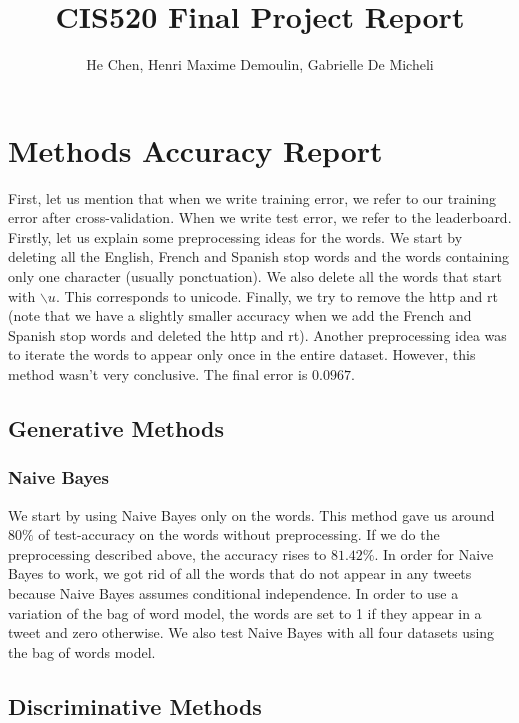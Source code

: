 \documentclass[11pt,twocolumn]{report}
\author{He Chen, Henri Maxime Demoulin, Gabrielle De Micheli}
\title{CIS520 Final Project Report}
\begin{document}
\maketitle
\section*{Methods Accuracy Report}
	First, let us mention that when we write training error, we refer to our training error after cross-validation. When we write test error, we refer to the leaderboard.\\
    
    Firstly, let us explain some preprocessing ideas for the words. We start by deleting all the English, French and Spanish stop words and the words containing only one character (usually ponctuation). We also delete all the words that start with $\backslash u$. This corresponds to unicode. Finally, we try to remove the http and rt (note that we have a slightly smaller accuracy when we add the French and Spanish stop words and deleted the http and rt).  Another preprocessing idea was to iterate the words to appear only once in the entire dataset. However, this method wasn't very conclusive. The final error is $0.0967$.
    
    \subsection*{Generative Methods}
    \subsubsection{Naive Bayes}
    We start by using Naive Bayes only on the words. This method gave us around $80 \%$ of test-accuracy on the words without preprocessing. If we do the preprocessing described above, the accuracy rises to $81.42\%$. In order for Naive Bayes to work, we got rid of all the words that do not appear in any tweets because Naive Bayes assumes conditional independence. In order to use a variation of the bag of word model, the words are set to 1 if they appear in a tweet and zero otherwise. We also test Naive Bayes with all four datasets using the bag of words model.  
   
   
    
    \subsection*{Discriminative Methods}
\end{document}
